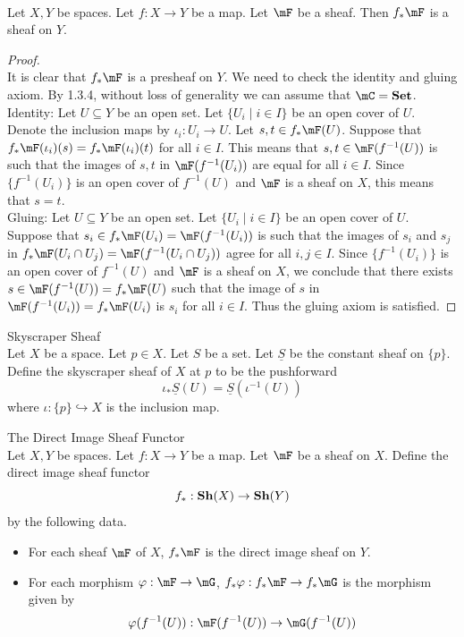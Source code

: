\documentclass[a4paper]{article}
\begin{document}
\begin{prp}{}{}\\
Let $X,Y$ be spaces. Let $f:X\to Y$ be a map. Let $\mF$ be a sheaf. Then $f_\ast\mF$ is a sheaf on $Y$. 
\begin{proof}\\
It is clear that $f_\ast\mF$ is a presheaf on $Y$. We need to check the identity and gluing axiom. By 1.3.4, without loss of generality we can assume that $\mC=\bold{Set}$. \\

Identity: Let $U\subseteq Y$ be an open set. Let $\{U_i\;|\;i\in I\}$ be an open cover of $U$. Denote the inclusion maps by $\iota_i:U_i\to U$. Let $s,t\in f_\ast\mF(U)$. Suppose that $f_\ast\mF(\iota_i)(s)=f_\ast\mF(\iota_i)(t)$ for all $i\in I$. This means that $s,t\in\mF(f^{-1}(U))$ is such that the images of $s,t$ in $\mF(f^{-1}(U_i))$ are equal for all $i\in I$. Since $\{f^{-1}(U_i)\}$ is an open cover of $f^{-1}(U)$ and $\mF$ is a sheaf on $X$, this means that $s=t$. \\

Gluing: Let $U\subseteq Y$ be an open set. Let $\{U_i\;|\;i\in I\}$ be an open cover of $U$. Suppose that $s_i\in f_\ast\mF(U_i)=\mF(f^{-1}(U_i))$ is such that the images of $s_i$ and $s_j$ in $f_\ast\mF(U_i\cap U_j)=\mF(f^{-1}(U_i\cap U_j))$ agree for all $i,j\in I$. Since $\{f^{-1}(U_i)\}$ is an open cover of $f^{-1}(U)$ and $\mF$ is a sheaf on $X$, we conclude that there exists $s\in\mF(f^{-1}(U))=f_\ast\mF(U)$ such that the image of $s$ in $\mF(f^{-1}(U_i))=f_\ast\mF(U_i)$ is $s_i$ for all $i\in I$. Thus the gluing axiom is satisfied. 
\end{proof}
\end{prp}

\begin{eg}{Skyscraper Sheaf}{}\\
Let $X$ be a space. Let $p\in X$. Let $S$ be a set. Let $\underline{S}$ be the constant sheaf on $\{p\}$. Define the skyscraper sheaf of $X$ at $p$ to be the pushforward $$\iota_\ast\underline{S}(U)=\underline{S}(\iota^{-1}(U))$$ where $\iota:\{p\}\hookrightarrow X$ is the inclusion map. 
\end{eg}

\begin{defn}{The Direct Image Sheaf Functor}{}\\
Let $X,Y$ be spaces. Let $f:X\to Y$ be a map. Let $\mF$ be a sheaf on $X$. Define the direct image sheaf functor $$f_\ast:\bold{Sh}(X)\to\bold{Sh}(Y)$$ by the following data. 
\begin{itemize}
\item For each sheaf $\mF$ of $X$, $f_\ast\mF$ is the direct image sheaf on $Y$. 
\item For each morphism $\varphi:\mF\to\mG$, $f_\ast\varphi:f_\ast\mF\to f_\ast\mG$ is the morphism given by $$\varphi(f^{-1}(U)):\mF(f^{-1}(U))\to\mG(f^{-1}(U))$$
\end{itemize}
\end{defn}
\end{document}
